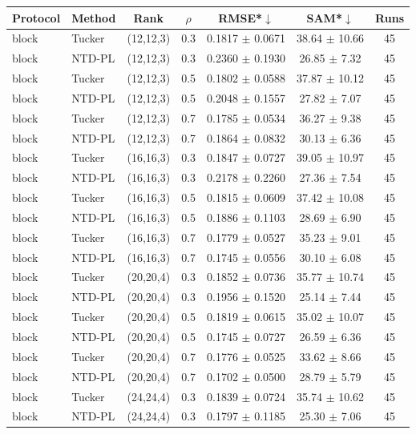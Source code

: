 \begin{tabular}{@{}l l c c c c c@{}}
\toprule
Protocol & Method & Rank & $\rho$ & RMSE*$\downarrow$ & SAM*$\downarrow$ & Runs\\
\midrule
block & Tucker & (12,12,3) & 0.3 & 0.1817 $\pm$ 0.0671 & 38.64 $\pm$ 10.66 & 45\\
block & NTD-PL & (12,12,3) & 0.3 & 0.2360 $\pm$ 0.1930 & 26.85 $\pm$ 7.32 & 45\\
block & Tucker & (12,12,3) & 0.5 & 0.1802 $\pm$ 0.0588 & 37.87 $\pm$ 10.12 & 45\\
block & NTD-PL & (12,12,3) & 0.5 & 0.2048 $\pm$ 0.1557 & 27.82 $\pm$ 7.07 & 45\\
block & Tucker & (12,12,3) & 0.7 & 0.1785 $\pm$ 0.0534 & 36.27 $\pm$ 9.38 & 45\\
block & NTD-PL & (12,12,3) & 0.7 & 0.1864 $\pm$ 0.0832 & 30.13 $\pm$ 6.36 & 45\\
block & Tucker & (16,16,3) & 0.3 & 0.1847 $\pm$ 0.0727 & 39.05 $\pm$ 10.97 & 45\\
block & NTD-PL & (16,16,3) & 0.3 & 0.2178 $\pm$ 0.2260 & 27.36 $\pm$ 7.54 & 45\\
block & Tucker & (16,16,3) & 0.5 & 0.1815 $\pm$ 0.0609 & 37.42 $\pm$ 10.08 & 45\\
block & NTD-PL & (16,16,3) & 0.5 & 0.1886 $\pm$ 0.1103 & 28.69 $\pm$ 6.90 & 45\\
block & Tucker & (16,16,3) & 0.7 & 0.1779 $\pm$ 0.0527 & 35.23 $\pm$ 9.01 & 45\\
block & NTD-PL & (16,16,3) & 0.7 & 0.1745 $\pm$ 0.0556 & 30.10 $\pm$ 6.08 & 45\\
block & Tucker & (20,20,4) & 0.3 & 0.1852 $\pm$ 0.0736 & 35.77 $\pm$ 10.74 & 45\\
block & NTD-PL & (20,20,4) & 0.3 & 0.1956 $\pm$ 0.1520 & 25.14 $\pm$ 7.44 & 45\\
block & Tucker & (20,20,4) & 0.5 & 0.1819 $\pm$ 0.0615 & 35.02 $\pm$ 10.07 & 45\\
block & NTD-PL & (20,20,4) & 0.5 & 0.1745 $\pm$ 0.0727 & 26.59 $\pm$ 6.36 & 45\\
block & Tucker & (20,20,4) & 0.7 & 0.1776 $\pm$ 0.0525 & 33.62 $\pm$ 8.66 & 45\\
block & NTD-PL & (20,20,4) & 0.7 & 0.1702 $\pm$ 0.0500 & 28.79 $\pm$ 5.79 & 45\\
block & Tucker & (24,24,4) & 0.3 & 0.1839 $\pm$ 0.0724 & 35.74 $\pm$ 10.62 & 45\\
block & NTD-PL & (24,24,4) & 0.3 & 0.1797 $\pm$ 0.1185 & 25.30 $\pm$ 7.06 & 45\\

\end{tabular}
